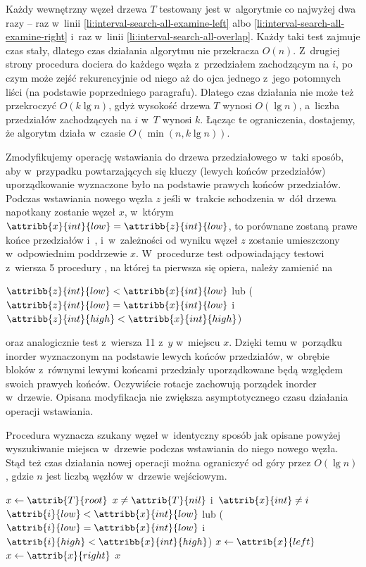 Każdy wewnętrzny węzeł drzewa $T$ testowany jest w~algorytmie co najwyżej dwa razy -- raz w~linii \ref{li:interval-search-all-examine-left} albo \ref{li:interval-search-all-examine-right} i~raz w~linii \ref{li:interval-search-all-overlap}.
Każdy taki test zajmuje czas stały, dlatego czas działania algorytmu nie przekracza $O(n)$.
Z~drugiej strony procedura dociera do każdego węzła z~przedziałem zachodzącym na $i$, po czym może zejść rekurencyjnie od niego aż do ojca jednego z~jego potomnych liści (na podstawie poprzedniego paragrafu).
Dlatego czas działania nie może też przekroczyć $O(k\lg n)$, gdyż wysokość drzewa $T$ wynosi $O(\lg n)$, a~liczba przedziałów zachodzących na $i$ w~$T$ wynosi $k$.
Łącząc te ograniczenia, dostajemy, że algorytm działa w~czasie $O(\min(n,k\lg n))$.

\exercise %
Zmodyfikujemy operację wstawiania do drzewa przedziałowego w~taki sposób, aby w~przypadku powtarzających się kluczy (lewych końców przedziałów) uporządkowanie wyznaczone było na podstawie prawych końców przedziałów.
Podczas wstawiania nowego węzła $z$ jeśli w~trakcie schodzenia w~dół drzewa napotkany zostanie węzeł $x$, w~którym $\attribb{x}{int}{low}=\attribb{z}{int}{low}$, to porównane zostaną prawe końce przedziałów  i~, i~w~zależności od wyniku węzeł $z$ zostanie umieszczony w~odpowiednim poddrzewie $x$.
W~procedurze  test odpowiadający testowi z~wiersza 5 procedury , na której ta pierwsza się opiera, należy zamienić na
\begin{codebox}
\zi \If $\attribb{z}{int}{low}<\attribb{x}{int}{low}$ lub ($\attribb{z}{int}{low}=\attribb{x}{int}{low}$ i~$\attribb{z}{int}{high}<\attribb{x}{int}{high}$)
\end{codebox}
oraz analogicznie test z~wiersza 11 z~$y$ w~miejscu $x$.
Dzięki temu w~porządku inorder wyznaczonym na podstawie lewych końców przedziałów, w~obrębie bloków z~równymi lewymi końcami przedziały uporządkowane będą względem swoich prawych końców.
Oczywiście rotacje zachowują porządek inorder w~drzewie.
Opisana modyfikacja nie zwiększa asymptotycznego czasu działania operacji wstawiania.

Procedura  wyznacza szukany węzeł w~identyczny sposób jak opisane powyżej wyszukiwanie miejsca w~drzewie podczas wstawiania do niego nowego węzła.
Stąd też czas działania nowej operacji można ograniczyć od góry przez $O(\lg n)$, gdzie $n$ jest liczbą węzłów w~drzewie wejściowym.
\begin{codebox}
\li	$x\gets\attrib{T}{root}$
\li	\While $x\ne\attrib{T}{nil}$ i~$\attrib{x}{int}\ne i$
\li		\Do \If $\attrib{i}{low}<\attribb{x}{int}{low}$ lub ($\attrib{i}{low}=\attribb{x}{int}{low}$ i~$\attrib{i}{high}<\attribb{x}{int}{high}$)
\li				\Then $x\gets\attrib{x}{left}$
\li				\Else $x\gets\attrib{x}{right}$
				\End
		\End
\li	\Return $x$
\end{codebox}

